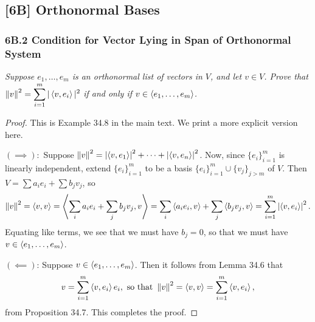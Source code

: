 \documentclass{article}
\begin{document}
\subsection*{[6B] Orthonormal Bases}
\subsubsection*{6B.2 Condition for Vector Lying in Span of Orthonormal System}
\textit{Suppose $e_1, \ldots, e_m$ is an orthonormal list of vectors in $V$, and let $v\in V$. Prove that}
$\displaystyle\left\Vert v\right\Vert^2 = \sum_{i=1}^m |\left\langle v, e_i\right\rangle|^2$
\textit{if and only if $v \in \left\langle e_1, \ldots, e_m\right\rangle$.}
\begin{proof}
This is Example 34.8 in the main text. We print a more explicit version here.

$(\implies):$ Suppose $\left\Vert v\right\Vert^2 = \left|\left\langle v, e_1\right\rangle\right|^2 + \cdots + \left|\left\langle v, e_n\right\rangle\right|^2$. Now, since $\{e_i\}_{i=1}^m$ is linearly independent, extend $\{e_i\}_{i=1}^m$ to be a basis $\{e_i\}_{i=1}^m \cup \{v_j\}_{j>m}$ of $V$. Then $V = \sum a_ie_i + \sum b_jv_j$, so
$$\left\Vert v\right\Vert^2 = \left\langle v, v\right\rangle = \left\langle\sum_i a_ie_i + \sum_j b_jv_j, v\right\rangle=\sum_i \left\langle a_ie_i, v\right\rangle + \sum_j\left\langle b_jv_j, v\right\rangle = \sum_{i=1}^m \left|\left\langle v,e_i\right\rangle\right|^2.$$
Equating like terms, we see that we must have $b_j = 0$, so that we must have $v\in\left\langle e_1, \ldots, e_m\right\rangle$.

$(\impliedby)$: Suppose $v\in \left\langle e_1, \ldots, e_m\right\rangle$. Then it follows from Lemma 34.6 that
$$v = \sum_{i=1}^m \left\langle v, e_i\right\rangle e_i, \textrm{ so that }\left\Vert v\right\Vert^2 = \left\langle v,v\right\rangle = \sum_{i=1}^m \left\langle v, e_i\right\rangle,$$
from Proposition 34.7. This completes the proof.
\end{proof}
\end{document}
